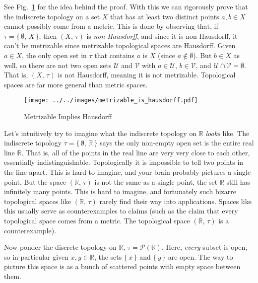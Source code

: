 \documentclass{article}
\theoremstyle{plain}
\theoremstyle{normal}
\newenvironment{example}{%
    \pushQED{\qed}\renewcommand{\qedsymbol}{$\blacksquare$}\examplex%
}{%
    \popQED\endexamplex%
}
\begin{document}
    See Fig.~\ref{fig:metrizable_is_hausdorff} for the idea behind the proof.
    With this we can rigorously prove that the indiscrete topology on a set
    $X$ that has at least two distinct points $a,b\in{X}$ cannot possibly
    come from a metric. This is done by observing that, if
    $\tau=\{\,\emptyset,\,X\,\}$, then $(X,\,\tau)$ is
    \textit{non-Hausdorff}, and since it is non-Hausdorff, it can't
    be metrizable since metrizable topological spaces are Hausdorff. Given
    $a\in{X}$, the only open set in $\tau$ that contains $a$ is
    $X$ (since $a\notin\emptyset$). But $b\in{X}$ as well, so
    there are not two open sets $\mathcal{U}$ and $\mathcal{V}$ with
    $a\in\mathcal{U}$, $b\in\mathcal{V}$, and
    $\mathcal{U}\cap\mathcal{V}=\emptyset$. That is, $(X,\,\tau)$ is not
    Hausdorff, meaning it is not metrizable. Topological spaces are
    far more general than metric spaces.
    \begin{figure}
        \centering
        \texttt{[image: ../../images/metrizable\_is\_hausdorff.pdf]}
        \caption{Metrizable Implies Hausdorff}
        \label{fig:metrizable_is_hausdorff}
    \end{figure}
    \begin{example}
        Let's intuitively try to imagine what the indiscrete
        topology on $\mathbb{R}$ \textit{looks} like. The indiscrete topology
        $\tau=\{\,\emptyset,\,\mathbb{R}\,\}$ says the only non-empty open set
        is the entire real line $\mathbb{R}$. That is, all of the points in the
        real line are very very close to each other, essentially
        indistinguishable. Topologically it is impossible to tell
        two points in the line apart. This is hard to imagine, and your brain
        probably pictures a single point. But the space $(\mathbb{R},\,\tau)$
        is not the same as a single point, the set $\mathbb{R}$ still has
        infinitely many points. This is hard to imagine, and fortunately such
        bizarre topological spaces like $(\mathbb{R},\,\tau)$ rarely find their
        way into applications. Spaces like this usually serve as counterexamples
        to claims (such as the claim that every topological space comes from a
        metric. The topological space $(\mathbb{R},\,\tau)$ is a
        counterexample).
    \end{example}
    \begin{example}
        Now ponder the discrete topology on $\mathbb{R}$,
        $\tau=\mathcal{P}(\mathbb{R})$. Here, \textit{every} subset is open,
        so in particular given $x,y\in\mathbb{R}$, the sets
        $\{\,x\,\}$ and $\{\,y\,\}$ are open. The way to picture this space is
        as a bunch of scattered points with empty space between them.
    \end{example}
\end{document}
